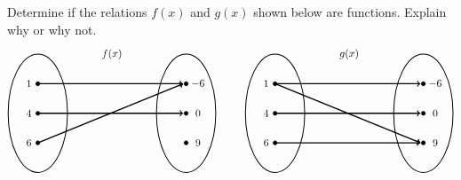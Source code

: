 \documentclass[11pt,letterpaper]{article}
\begin{document}


 Determine if the relations $f(x)$ and $g(x)$ shown below are functions. Explain why or why not. 
	\[
	\begin{tikzpicture}
	\node at (2.5,2) {$f(x)$};
	\draw[line width=0.03cm] (0,0) circle (1 and 2);
	\draw[line width=0.03cm] (5,0) circle (1 and 2);
	
	\draw[fill=black] (0,1) circle (0.07);
	\draw[fill=black] (0,0) circle (0.07);
	\draw[fill=black] (0,-1) circle (0.07);
	
	\draw[fill=black] (5,1) circle (0.07);
	\draw[fill=black] (5,0) circle (0.07);
	\draw[fill=black] (5,-1) circle (0.07);
	
	\draw[line width=0.04cm,->] (0,1) -- (4.9,1);
	\draw[line width=0.04cm,->] (0,0) -- (4.9,0);
	\draw[line width=0.04cm,->] (0,-1) -- (4.9,1);
	
	\node at (-0.3,1) {$1$};
	\node at (-0.3,0) {$4$};
	\node at (-0.3,-1) {$6$};
	
	\node at (5.4,1) {$-6$};
	\node at (5.4,0) {$0$};
	\node at (5.4,-1) {$9$};
	
	\tikzset{shift={(8,0)}}
	\node at (2.5,2) {$g(x)$};
	\draw[line width=0.03cm] (0,0) circle (1 and 2);
	\draw[line width=0.03cm] (5,0) circle (1 and 2);
	
	\draw[fill=black] (0,1) circle (0.07);
	\draw[fill=black] (0,0) circle (0.07);
	\draw[fill=black] (0,-1) circle (0.07);
	
	\draw[fill=black] (5,1) circle (0.07);
	\draw[fill=black] (5,0) circle (0.07);
	\draw[fill=black] (5,-1) circle (0.07);
	
	\draw[line width=0.04cm,->] (0,1) -- (4.9,1);
	\draw[line width=0.04cm,->] (0,1) -- (4.9,-1);
	\draw[line width=0.04cm,->] (0,0) -- (4.9,0);
	\draw[line width=0.04cm,->] (0,-1) -- (4.9,-1);
	
	\node at (-0.3,1) {$1$};
	\node at (-0.3,0) {$4$};
	\node at (-0.3,-1) {$6$};
	
	\node at (5.4,1) {$-6$};
	\node at (5.4,0) {$0$};
	\node at (5.4,-1) {$9$};
	\end{tikzpicture}
	\]



\newpage
\end{document}
